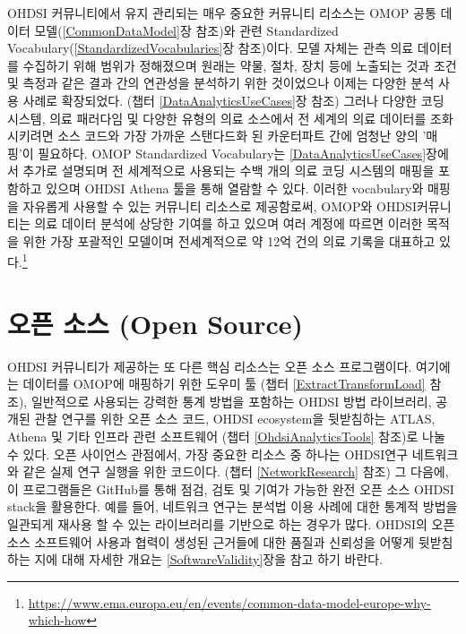 \documentclass[11pt]{book}
\let\rmarkdownfootnote\footnote%
\def\footnote{\protect\rmarkdownfootnote}
\theoremstyle{definition}
\theoremstyle{definition}
\theoremstyle{definition}
\theoremstyle{remark}
\begin{document}

OHDSI 커뮤니티에서 유지 관리되는 매우 중요한 커뮤니티 리소스는 OMOP 공통
데이터 모델(\ref{CommonDataModel}장 참조)와 관련 Standardized
Vocabulary(\ref{StandardizedVocabularies}장 참조)이다. 모델 자체는 관측
의료 데이터를 수집하기 위해 범위가 정해졌으며 원래는 약물, 절차, 장치
등에 노출되는 것과 조건 및 측정과 같은 결과 간의 연관성을 분석하기 위한
것이었으나 이제는 다양한 분석 사용 사례로 확장되었다. (챕터
\ref{DataAnalyticsUseCases}장 참조) 그러나 다양한 코딩 시스템, 의료
패러다임 및 다양한 유형의 의료 소스에서 전 세계의 의료 데이터를
조화시키려면 소스 코드와 가장 가까운 스탠다드화 된 카운터파트 간에
엄청난 양의 '매핑'이 필요하다. OMOP Standardized Vocabulary는
\ref{DataAnalyticsUseCases}장에서 추가로 설명되며 전 세계적으로 사용되는
수백 개의 의료 코딩 시스템의 매핑을 포함하고 있으며 OHDSI Athena 툴을
통해 열람할 수 있다. 이러한 vocabulary와 매핑을 자유롭게 사용할 수 있는
커뮤니티 리소스로 제공함로써, OMOP와 OHDSI커뮤니티는 의료 데이터 분석에
상당한 기여를 하고 있으며 여러 계정에 따르면 이러한 목적을 위한 가장
포괄적인 모델이며 전세계적으로 약 12억 건의 의료 기록을 대표하고
있다.\footnote{\url{https://www.ema.europa.eu/en/events/common-data-model-europe-why-which-how}}
\citep{garza_2016}

\section{오픈 소스 (Open Source)}\label{--open-source}


OHDSI 커뮤니티가 제공하는 또 다른 핵심 리소스는 오픈 소스 프로그램이다.
여기에는 데이터를 OMOP에 매핑하기 위한 도우미 툴 (챕터
\ref{ExtractTransformLoad} 참조), 일반적으로 사용되는 강력한 통계 방법을
포함하는 OHDSI 방법 라이브러리, 공개된 관찰 연구를 위한 오픈 소스 코드,
OHDSI ecosystem을 뒷받침하는 ATLAS, Athena 및 기타 인프라 관련
소프트웨어 (챕터 \ref{OhdsiAnalyticsTools} 참조)로 나눌 수 있다. 오픈
사이언스 관점에서, 가장 중요한 리소스 중 하나는 OHDSI연구 네트워크와
같은 실제 연구 실행을 위한 코드이다. (챕터 \ref{NetworkResearch} 참조)
그 다음에, 이 프로그램들은 GitHub를 통해 점검, 검토 및 기여가 가능한
완전 오픈 소스 OHDSI stack을 활용한다. 예를 들어, 네트워크 연구는 분석법
이용 사례에 대한 통계적 방법을 일관되게 재사용 할 수 있는 라이브러리를
기반으로 하는 경우가 많다. OHDSI의 오픈 소스 소프트웨어 사용과 협력이
생성된 근거들에 대한 품질과 신뢰성을 어떻게 뒷받침하는 지에 대해 자세한
개요는 \ref{SoftwareValidity}장을 참고 하기 바란다.
\end{document}
